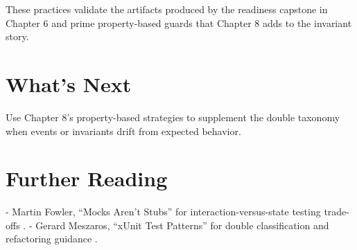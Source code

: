 These practices validate the artifacts produced by the readiness capstone in Chapter 6 and prime property-based guards that Chapter 8 adds to the invariant story.

\section{What's Next}
Use Chapter 8’s property-based strategies to supplement the double taxonomy when events or invariants drift from expected behavior.

\section{Further Reading}
- Martin Fowler, “Mocks Aren’t Stubs” for interaction-versus-state testing trade-offs \citep{fowler2007mocks}.
- Gerard Meszaros, “xUnit Test Patterns” for double classification and refactoring guidance \citep{meszaros2007xunit}.
